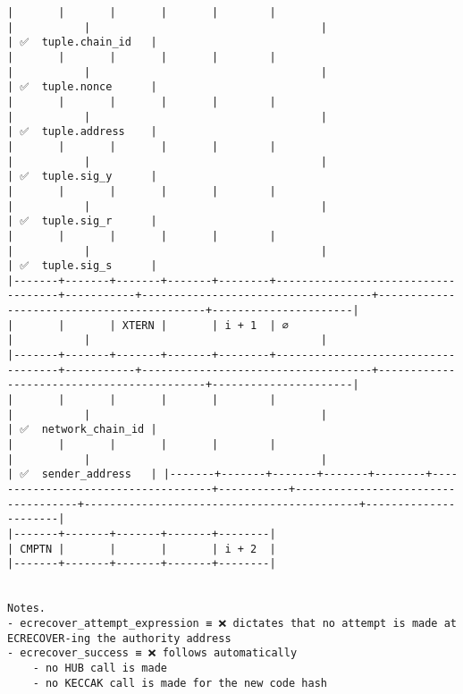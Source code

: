 \documentclass[varwidth=\maxdimen,margin=0.5cm,multi={verbatim}]{standalone}
\begin{document}
\begin{verbatim}
|       |       |       |       |        |                                    |           |                                    |                                           | ✅  tuple.chain_id   |
|       |       |       |       |        |                                    |           |                                    |                                           | ✅  tuple.nonce      |
|       |       |       |       |        |                                    |           |                                    |                                           | ✅  tuple.address    |
|       |       |       |       |        |                                    |           |                                    |                                           | ✅  tuple.sig_y      |
|       |       |       |       |        |                                    |           |                                    |                                           | ✅  tuple.sig_r      |
|       |       |       |       |        |                                    |           |                                    |                                           | ✅  tuple.sig_s      |
|-------+-------+-------+-------+--------+------------------------------------+-----------+------------------------------------+-------------------------------------------+----------------------|
|       |       | XTERN |       | i + 1  | ∅                                  |           |                                    |
|-------+-------+-------+-------+--------+------------------------------------+-----------+------------------------------------+-------------------------------------------+----------------------|
|       |       |       |       |        |                                    |           |                                    |                                           | ✅  network_chain_id |
|       |       |       |       |        |                                    |           |                                    |                                           | ✅  sender_address   | |-------+-------+-------+-------+--------+------------------------------------+-----------+------------------------------------+-------------------------------------------+----------------------|
|-------+-------+-------+-------+--------|
| CMPTN |       |       |       | i + 2  |
|-------+-------+-------+-------+--------|


Notes.
- ecrecover_attempt_expression ≡ ❌ dictates that no attempt is made at ECRECOVER-ing the authority address
- ecrecover_success ≡ ❌ follows automatically
	- no HUB call is made
	- no KECCAK call is made for the new code hash

\end{verbatim}
\end{document}

